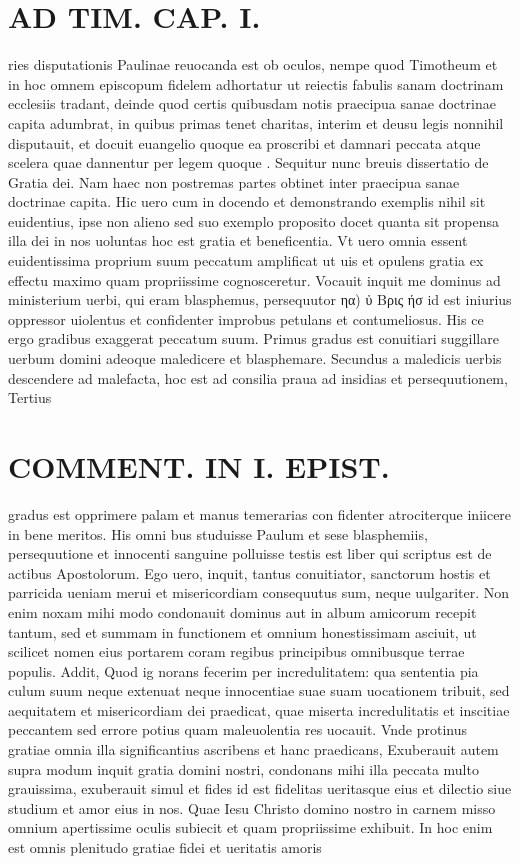 \documentclass{article}
\begin{document}
\begin{pages}
\section*{AD TIM. CAP. I. }
\marginpar{[ p.103 ]}\pstart ries disputationis Paulinae reuocanda est ob oculos, nempe quod Timotheum et in hoc omnem episcopum fidelem adhortatur ut reiectis fabulis sanam doctrinam ecclesiis tradant, deinde quod certis quibusdam notis praecipua sanae doctrinae capita adumbrat, in quibus primas tenet charitas, interim et deusu legis nonnihil disputauit, et docuit euangelio quoque ea proscribi et damnari peccata atque scelera quae dannentur per legem quoque . Sequitur nunc breuis dissertatio de Gratia dei. Nam haec non postremas partes obtinet inter praecipua sanae doctrinae capita. Hic uero cum in docendo et demonstrando exemplis nihil sit euidentius, ipse non alieno sed suo exemplo proposito docet quanta sit propensa illa dei in nos uoluntas hoc est gratia et beneficentia. Vt uero omnia essent euidentissima proprium suum peccatum amplificat ut uis et opulens gratia ex effectu maximo quam propriissime cognosceretur. Vocauit inquit me dominus ad ministerium uerbi, qui eram blasphemus, persequutor ηα) ὐ Βρις ήσ id est iniurius oppressor uiolentus et confidenter improbus petulans et contumeliosus. His ce ergo gradibus exaggerat peccatum suum. Primus gradus est conuitiari suggillare uerbum domini adeoque maledicere et blasphemare. Secundus a maledicis uerbis descendere ad malefacta, hoc est ad consilia praua ad insidias et persequutionem, Tertius  \pend
\section*{COMMENT. IN I. EPIST. }\pstart gradus est opprimere palam et manus temerarias con fidenter atrociterque iniicere in bene meritos. His omni bus studuisse Paulum et sese blasphemiis, persequutione et innocenti sanguine polluisse testis est liber qui scriptus est de actibus Apostolorum. Ego uero, inquit, tantus conuitiator, sanctorum hostis et parricida ueniam merui et misericordiam consequutus sum, neque  uulgariter. Non enim noxam mihi modo condonauit dominus aut in album amicorum recepit tantum, sed et summam in functionem et omnium honestissimam asciuit, ut scilicet nomen eius portarem coram regibus principibus omnibusque terrae populis. Addit, Quod ig norans fecerim per incredulitatem: qua sententia pia culum suum neque extenuat neque innocentiae suae suam uocationem tribuit, sed aequitatem et misericordiam dei praedicat, quae miserta incredulitatis et inscitiae peccantem sed errore potius quam maleuolentia res uocauit. Vnde protinus gratiae omnia illa significantius ascribens et hanc praedicans, Exuberauit autem supra modum inquit gratia domini nostri, condonans mihi illa peccata multo grauissima, exuberauit simul et fides id est fidelitas ueritasque eius et dilectio siue studium et amor eius in nos. Quae Iesu Christo domino nostro in carnem misso omnium apertissime oculis subiecit et quam propriissime exhibuit. In hoc enim est omnis plenitudo gratiae fidei et ueritatis amoris  \pend

\end{pages}
\end{document}
